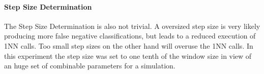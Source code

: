 \paragraph{Step Size Determination} \label{step_size_determination}
The Step Size Determination is also not trivial. A oversized step size is very likely producing more false negative
classifications, but leads to a reduced execution of 1NN calls. Too small step sizes on the other hand will overuse the
1NN calls. In this experiment the step size was set to one tenth of the window size in view of an huge set of combinable
parameters for a simulation.

